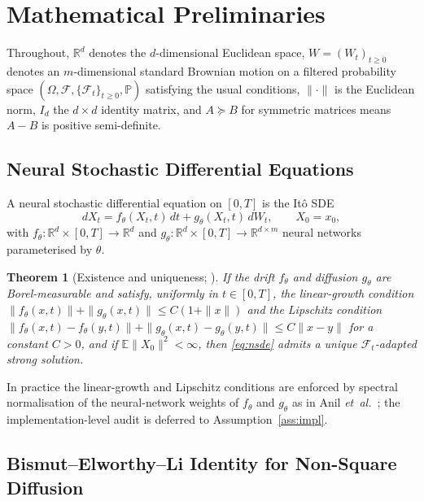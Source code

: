 \documentclass{ieeeaccess}
\newtheorem{theorem}{Theorem}
\newcommand{\Real}{\mathbb{R}}
\newcommand{\Exp}{\mathbb{E}}
\newcommand{\Prob}{\mathbb{P}}
\newcommand{\Fcal}{\mathcal{F}}
\begin{document}
\section{Mathematical Preliminaries}\label{sec:prelim}
Throughout, $\Real^d$ denotes the $d$-dimensional Euclidean space,
$W=(W_t)_{t\geq 0}$ denotes an $m$-dimensional standard Brownian motion
on a filtered probability space
$(\Omega,\Fcal,\{\Fcal_t\}_{t\geq 0},\Prob)$ satisfying the usual
conditions, $\|\cdot\|$ is the Euclidean norm, $I_d$ the $d\times d$
identity matrix, and $A\succeq B$ for symmetric matrices means $A-B$
is positive semi-definite.

\subsection{Neural Stochastic Differential Equations}\label{subsec:nsde}
A neural stochastic differential equation on $[0,T]$ is the It\^o SDE
\begin{equation}\label{eq:nsde}
  dX_t = f_\theta(X_t,t)\,dt + g_\theta(X_t,t)\,dW_t,\qquad X_0=x_0,
\end{equation}
with $f_\theta:\Real^d\!\times\![0,T]\!\to\!\Real^d$ and
$g_\theta:\Real^d\!\times\![0,T]\!\to\!\Real^{d\times m}$ neural
networks parameterised by $\theta$.

\begin{theorem}[Existence and uniqueness; {\protect\cite[Thm.~5.2.1]{oksendal2003}}]\label{thm:eu}
If the drift $f_\theta$ and diffusion $g_\theta$ are Borel-measurable
and satisfy, uniformly in $t\in[0,T]$, the linear-growth condition
$\|f_\theta(x,t)\|+\|g_\theta(x,t)\|\leq C(1+\|x\|)$
and the Lipschitz condition
$\|f_\theta(x,t)-f_\theta(y,t)\|+\|g_\theta(x,t)-g_\theta(y,t)\|\leq
C\|x-y\|$ for a constant $C>0$, and if $\Exp\|X_0\|^2<\infty$, then
\eqref{eq:nsde} admits a unique $\Fcal_t$-adapted strong solution.
\end{theorem}

In practice the linear-growth and Lipschitz conditions are enforced by
spectral normalisation of the neural-network weights of $f_\theta$ and
$g_\theta$ as in Anil \textit{et~al.}~\cite{anil2019sorting}; the
implementation-level audit is deferred to Assumption~\ref{ass:impl}.

\subsection{Bismut--Elworthy--Li Identity for Non-Square Diffusion}
\label{subsec:bel}
\end{document}
